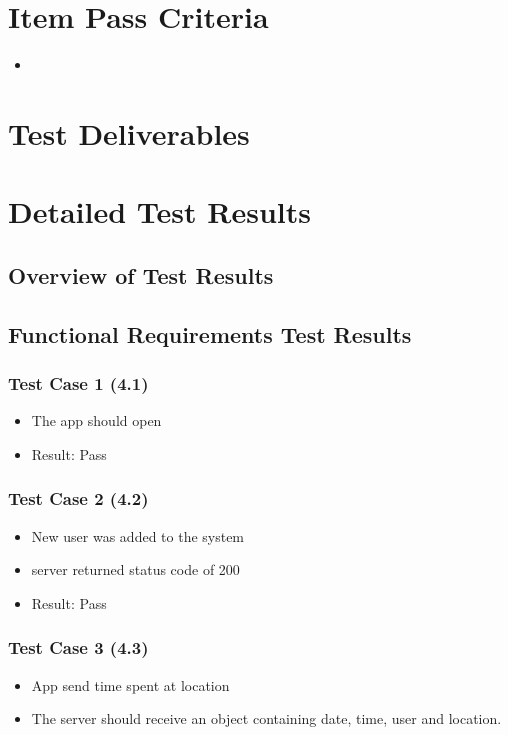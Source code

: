 \documentclass[11pt]{article}
\begin{document}
\section{Item Pass Criteria}
\begin{itemize}
	\item 	
\end{itemize}

\section{Test Deliverables}

\section{Detailed Test Results}
\subsection{Overview of Test Results}

\subsection{Functional Requirements Test Results}

\subsubsection{Test Case 1 (4.1)}
\begin{itemize}
	\item The app should open
	\item Result: Pass
\end{itemize}

\subsubsection{Test Case 2 (4.2)}
\begin{itemize}
	\item New user was added to the system
	\item server returned status code of 200
	\item 	Result: Pass
\end{itemize}
\subsubsection{Test Case 3 (4.3)}
\begin{itemize}
	\item App send time spent at location
	\item The server should receive an object containing date, time, user and location.
\end{itemize}
\end{document}
